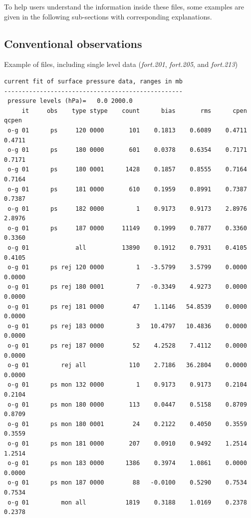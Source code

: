 To help users understand the information inside these files, some examples are given in the following sub-sections with corresponding explanations.

\subsection{Conventional observations}
\label{sec4.5.1}

Example of files, including single level data (\textit{fort.201}, \textit{fort.205}, and \textit{fort.213})

\begin{scriptsize}
\begin{verbatim}
current fit of surface pressure data, ranges in mb
--------------------------------------------------
 pressure levels (hPa)=   0.0 2000.0
     it     obs    type stype    count      bias       rms      cpen     qcpen
 o-g 01      ps     120 0000       101    0.1813    0.6089    0.4711    0.4711
 o-g 01      ps     180 0000       601    0.0378    0.6354    0.7171    0.7171
 o-g 01      ps     180 0001      1428    0.1857    0.8555    0.7164    0.7164
 o-g 01      ps     181 0000       610    0.1959    0.8991    0.7387    0.7387
 o-g 01      ps     182 0000         1    0.9173    0.9173    2.8976    2.8976
 o-g 01      ps     187 0000     11149    0.1999    0.7877    0.3360    0.3360
 o-g 01             all          13890    0.1912    0.7931    0.4105    0.4105
 o-g 01      ps rej 120 0000         1   -3.5799    3.5799    0.0000    0.0000
 o-g 01      ps rej 180 0001         7   -0.3349    4.9273    0.0000    0.0000
 o-g 01      ps rej 181 0000        47    1.1146   54.8539    0.0000    0.0000
 o-g 01      ps rej 183 0000         3   10.4797   10.4836    0.0000    0.0000
 o-g 01      ps rej 187 0000        52    4.2528    7.4112    0.0000    0.0000
 o-g 01         rej all            110    2.7186   36.2804    0.0000    0.0000
 o-g 01      ps mon 132 0000         1    0.9173    0.9173    0.2104    0.2104
 o-g 01      ps mon 180 0000       113    0.0447    0.5158    0.8709    0.8709
 o-g 01      ps mon 180 0001        24    0.2122    0.4050    0.3559    0.3559
 o-g 01      ps mon 181 0000       207    0.0910    0.9492    1.2514    1.2514
 o-g 01      ps mon 183 0000      1386    0.3974    1.0861    0.0000    0.0000
 o-g 01      ps mon 187 0000        88   -0.0100    0.5290    0.7534    0.7534
 o-g 01         mon all           1819    0.3188    1.0169    0.2378    0.2378
\end{verbatim}
\end{scriptsize}

